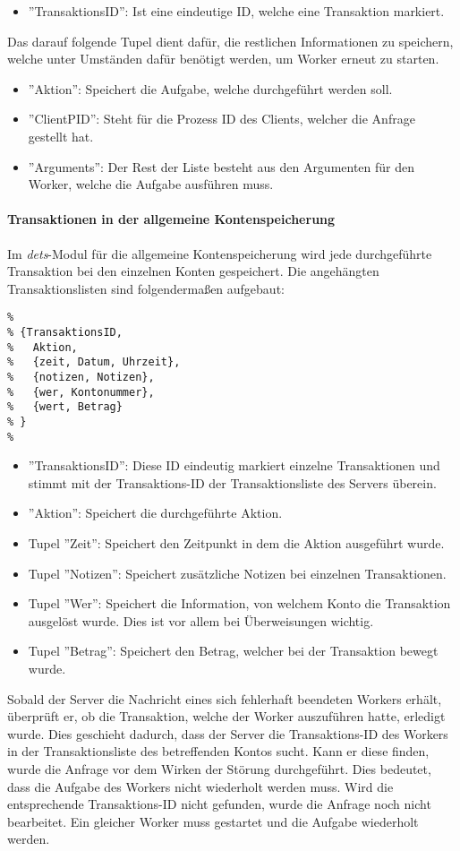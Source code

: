 \begin{itemize}
	\item ''TransaktionsID'': Ist eine eindeutige ID, welche eine Transaktion markiert.
\end{itemize}
Das darauf folgende Tupel dient dafür, die restlichen Informationen zu speichern, welche unter Umständen dafür benötigt werden, um Worker erneut zu starten.
\begin{itemize}
	\item ''Aktion'': Speichert die Aufgabe, welche durchgeführt werden soll.
	\item ''ClientPID'': Steht für die Prozess ID des Clients, welcher die Anfrage gestellt hat.
	\item ''Arguments'': Der Rest der Liste besteht aus den Argumenten für den Worker, welche die Aufgabe ausführen muss.
\end{itemize}

\paragraph{Transaktionen in der allgemeine Kontenspeicherung}

Im \textit{dets}-Modul für die allgemeine Kontenspeicherung wird jede durchgeführte Transaktion bei den einzelnen Konten gespeichert. Die angehängten Transaktionslisten sind folgendermaßen aufgebaut:

\begin{lstlisting}
% 
% {TransaktionsID,
%	Aktion,
%	{zeit, Datum, Uhrzeit},
%	{notizen, Notizen},
%	{wer, Kontonummer},
%	{wert, Betrag}
% }
%  
\end{lstlisting}

\begin{itemize}
	\item ''TransaktionsID'': Diese ID eindeutig markiert einzelne Transaktionen und stimmt mit der Transaktions-ID der Transaktionsliste des Servers überein.
	\item ''Aktion'': Speichert die durchgeführte Aktion.
	\item Tupel ''Zeit'': Speichert den Zeitpunkt in dem die Aktion ausgeführt wurde.
	\item Tupel ''Notizen'': Speichert zusätzliche Notizen bei einzelnen Transaktionen.
	\item Tupel ''Wer'': Speichert die Information, von welchem Konto die Transaktion ausgelöst wurde. Dies ist vor allem bei Überweisungen wichtig.
	\item Tupel ''Betrag'': Speichert den Betrag, welcher bei der Transaktion bewegt wurde.
\end{itemize}
Sobald der Server die Nachricht eines sich fehlerhaft beendeten Workers erhält, überprüft er, ob die Transaktion, welche der Worker auszuführen hatte, erledigt wurde. Dies geschieht dadurch, dass der Server die Transaktions-ID des Workers in der Transaktionsliste des betreffenden Kontos sucht. Kann er diese finden, wurde die Anfrage vor dem Wirken der Störung durchgeführt. Dies bedeutet, dass die Aufgabe des Workers nicht wiederholt werden muss. Wird die entsprechende Transaktions-ID nicht gefunden, wurde die Anfrage noch nicht bearbeitet. Ein gleicher Worker muss gestartet und die Aufgabe wiederholt werden.

%
%
%